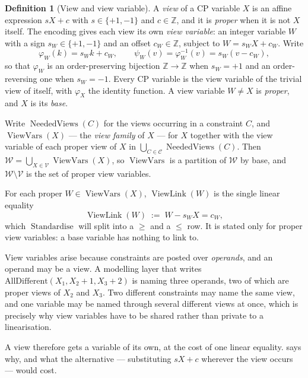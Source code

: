 \documentclass[11pt,a4paper]{article}
\theoremstyle{plain}
\theoremstyle{definition}
\newtheorem{definitionT}{Definition}
\theoremstyle{remark}
\newcommand{\fname}[1]{\ensuremath{\operatorname{#1}}}
\newcommand{\globalcon}[1]{\ensuremath{\mathrm{#1}}}
\newcommand{\ViewVars}{\fname{ViewVars}}
\newcommand{\ViewLink}{\fname{ViewLink}}
\newcommand{\Standardise}{\fname{Standardise}}
\newcommand{\NeededViews}{\fname{NeededViews}}
\begin{document}
\begin{definitionT}[View and view variable]
\label{def:view}
A \emph{view} of a CP variable $X$ is an affine expression $sX+c$ with
$s\in\{+1,-1\}$ and $c\in\mathbb Z$, and it is \emph{proper} when it is not $X$
itself.  The encoding gives each view its own \emph{view variable}: an integer
variable $W$ with a sign $s_W\in\{+1,-1\}$ and an offset $c_W\in\mathbb Z$,
subject to $W = s_W X + c_W$.  Write
\[
  \varphi_W(k) = s_W k + c_W, \qquad
  \psi_W(v) = \varphi_W^{-1}(v) = s_W(v - c_W),
\]
so that $\varphi_W$ is an order-preserving bijection $\mathbb Z\to\mathbb Z$
when $s_W=+1$ and an order-reversing one when $s_W=-1$.  Every CP variable is
the view variable of the trivial view of itself, with $\varphi_X$ the identity
function.  A view variable $W\neq X$ is \emph{proper}, and $X$ is its
\emph{base}.

Write $\NeededViews(C)$ for the views occurring in a constraint $C$, and
$\ViewVars(X)$ --- the \emph{view family} of $X$ --- for $X$ together with the
view variable of each proper view of $X$ in
$\bigcup_{C\in\mathcal C}\NeededViews(C)$.  Then
$\mathcal W = \bigcup_{X\in\mathcal V}\ViewVars(X)$, so $\ViewVars$ is a
partition of $\mathcal W$ by base, and $\mathcal W\setminus\mathcal V$ is the
set of proper view variables.
\end{definitionT}

For each proper $W\in\ViewVars(X)$, $\ViewLink(W)$ is the single linear equality
\begin{equation}
  \ViewLink(W) \;:=\; W - s_W X = c_W ,
  \label{eq:link}
\end{equation}
which \Standardise{} will split into a $\geq$ and a $\leq$ row.  It is stated
only for proper view variables: a base variable has nothing to link to.

View variables arise because constraints are posted over \emph{operands}, and an
operand may be a view.  A modelling layer that writes
$\globalcon{AllDifferent}(X_1, X_2+1, X_3+2)$ is naming three operands, two of
which are proper views of $X_2$ and $X_3$.  Two different constraints may name
the same view, and one variable may be named through several different views at
once, which is precisely why view variables have to be shared rather than
private to a linearisation.

A view therefore gets a variable of its own, at the cost of one linear equality.
 says why, and what the alternative --- substituting
$sX+c$ wherever the view occurs --- would cost.
\end{document}

